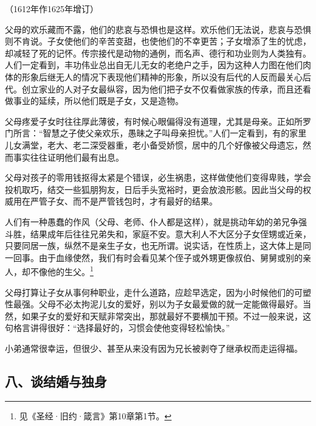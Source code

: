 \begin{center}
    （1612年作1625年增订）
\end{center}
\par 父母的欢乐藏而不露，他们的悲哀与恐惧也是这样。欢乐他们无法说，悲哀与恐惧则不肯说。子女使他们的辛苦变甜，也使他们的不幸更苦；子女增添了生的忧虑，却减轻了死的记怀。传宗接代是动物的通例，而名声、德行和功业则为人类独有。人们一定看到，丰功伟业总出自无儿无女的老绝户之手，因为这种人力图在他们肉体的形象后继无人的情况下表现他们精神的形象，所以没有后代的人反而最关心后代。创立家业的人对子女最纵容，因为他们把子女不仅看做家族的传承，而且还看做事业的延续，所以他们既是子女，又是造物。
\par 父母疼爱子女时往往厚此薄彼，有时候心眼偏得没有道理，尤其是母亲。正如所罗门所言：“智慧之子使父亲欢乐，愚昧之子叫母亲担忧。”人们一定看到，有的家里儿女满堂，老大、老二深受器重，老小备受娇惯，居中的几个好像被父母遗忘，然而事实往往证明他们最有出息。
\par 父母对孩子的零用钱抠得太紧是个错误，必生祸患，这样做使他们变得卑贱，学会投机取巧，结交一些狐朋狗友，日后手头宽裕时，更会放浪形骸。因此当父母的权威用在严管子女、而不是严管钱包时，才有最好的结果。
\par 人们有一种愚蠢的作风（父母、老师、仆人都是这样），就是挑动年幼的弟兄争强斗胜，结果成年后往往兄弟失和，家庭不安。意大利人不大区分子女侄甥或近亲，只要同居一族，纵然不是亲生子女，也无所谓。说实话，在性质上，这大体上是同一回事。由于血缘使然，我们有时会看见某个侄子或外甥更像叔伯、舅舅或别的亲人，却不像他的生父。\footnote{见《圣经·旧约·箴言》第10章第1节。}
\par 父母打算让子女从事何种职业，走什么道路，应趁早选定，因为小时候他们的可塑性最强。父母不必太拘泥儿女的爱好，别以为子女最爱做的就一定能做得最好。当然，如果子女的爱好和天赋非常突出，那就最好不要横加干预。不过一般来说，这句格言讲得很好：“选择最好的，习惯会使他变得轻松愉快。”
\par 小弟通常很幸运，但很少、甚至从来没有因为兄长被剥夺了继承权而走运得福。



\subsection*{八、谈结婚与独身}

